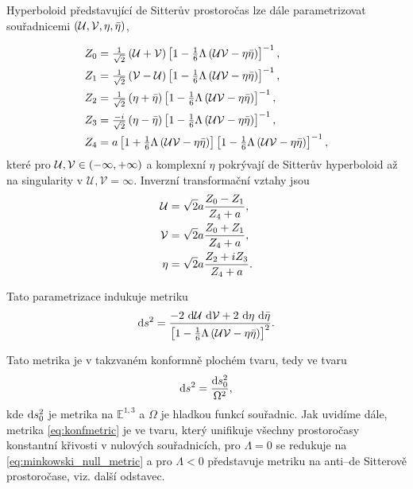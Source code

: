 Hyperboloid představující de Sitterův prostoročas lze dále parametrizovat souřadnicemi $(\mathcal{U}, \mathcal{V}, \eta, \bar{\eta})$,

\begin{equation}
     \label{eq:5DToNullMetricTransformation}
     \begin{split}
          Z_0 &= \tfrac{1}{\sqrt{2}} \left(\mathcal{U} + \mathcal{V}\right) \left[1-\tfrac{1}{6} \Lambda \left(\mathcal{U} \mathcal{V} - \eta \bar{\eta}\right)\right]^{-1}, \\
          Z_1 &= \tfrac{1}{\sqrt{2}} \left(\mathcal{V} - \mathcal{U}\right) \left[1-\tfrac{1}{6} \Lambda \left(\mathcal{U} \mathcal{V} - \eta \bar{\eta}\right)\right]^{-1}, \\
          Z_2 &= \tfrac{1}{\sqrt{2}} \left(\eta + \bar{\eta}\right) \left[1-\tfrac{1}{6} \Lambda \left(\mathcal{U} \mathcal{V} - \eta \bar{\eta}\right)\right]^{-1}, \\
          Z_3 &= \tfrac{-i}{\sqrt{2}} \left(\eta - \bar{\eta}\right) \left[1-\tfrac{1}{6} \Lambda \left(\mathcal{U} \mathcal{V} - \eta \bar{\eta}\right)\right]^{-1}, \\
          Z_4 &= a \left[1 + \tfrac{1}{6} \Lambda \left(\mathcal{U} \mathcal{V} - \eta \bar{\eta}\right)\right] \left[1-\tfrac{1}{6} \Lambda \left(\mathcal{U} \mathcal{V} - \eta \bar{\eta}\right)\right]^{-1},
     \end{split}
\end{equation}
které pro $\mathcal{U}, \mathcal{V} \in \left(-\infty, +\infty\right)$ a komplexní $\eta$ pokrývají de Sitterův hyperboloid až na singularity v  $\mathcal{U}, \mathcal{V} = \infty$.
Inverzní transformační vztahy jsou
\begin{equation}
     \label{eq:NullConformalToD5Transformation}
     \begin{split}
          \mathcal{U} &= \sqrt{2} a \frac{Z_0 - Z_1}{Z_4 + a}, \\
          \mathcal{V} &= \sqrt{2} a \frac{Z_0 + Z_1}{Z_4 + a}, \\
          \eta &= \sqrt{2} a \frac{Z_2 + i Z_3}{Z_4 + a}.
     \end{split}
\end{equation}

Tato parametrizace indukuje metriku
\begin{equation}
     \label{eq:konfmetric}
     \mathrm{d} s^2 = \frac{-2 ~ \mathrm{d} \mathcal{U} ~ \mathrm{d} \mathcal{V} + 2 ~ \mathrm{d} \eta ~ \mathrm{d} \bar{\eta}}{\left[1-\tfrac{1}{6} \Lambda \left(\mathcal{U} \mathcal{V} - \eta \bar{\eta}\right)\right]^2}.
\end{equation}

Tato metrika je v takzvaném konformně plochém tvaru, tedy ve tvaru
\begin{equation}
     \mathrm{d} s^2 = \frac{\mathrm{d} s_0^2}{\Omega^2},
\end{equation}
kde $\mathrm{d} s_0^2$ je metrika na $\mathbb{E}^{1,3}$ a $\Omega$ je hladkou funkcí souřadnic. Jak uvidíme dále,
metrika \eqref{eq:konfmetric} je ve tvaru, který unifikuje všechny prostoročasy konstantní křivosti v nulových souřadnicích,
pro $\Lambda = 0$ se redukuje na \eqref{eq:minkowski_null_metric} a pro $\Lambda < 0$ představuje metriku na
anti--de Sitterově prostoročase, viz. další odstavec.

